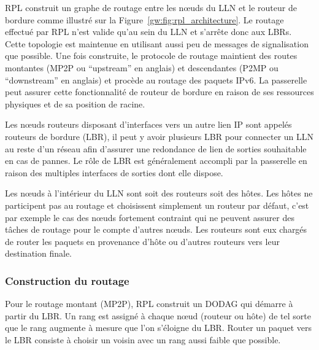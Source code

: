 \ac{RPL} construit un graphe de routage entre les nœuds du \ac{LLN} et le routeur de bordure comme illustré sur la Figure~\ref{gw:fig:rpl_architecture}.
Le routage effectué par \ac{RPL} n'est valide qu'au sein du \ac{LLN} et s'arrête donc aux \ac{LBR}s.
Cette topologie est maintenue en utilisant aussi peu de messages de signalisation que possible.
Une fois construite, le protocole de routage maintient des routes montantes (\ac{MP2P} ou ``upstream'' en anglais) et descendantes (\ac{P2MP} ou ``downstream'' en anglais) et procède au routage des paquets IPv6.
La passerelle peut assurer cette fonctionnalité de routeur de bordure en raison de ses ressources physiques et de sa position de racine.



Les nœuds routeurs disposant d'interfaces vers un autre lien IP sont appelés routeurs de bordure (\ac{LBR}), il peut y avoir plusieurs \ac{LBR} pour connecter un \ac{LLN} au reste d'un réseau afin d'assurer une redondance de lien de sorties souhaitable en cas de pannes.
Le rôle de \ac{LBR} est généralement accompli par la passerelle en raison des multiples interfaces de sorties dont elle dispose.

Les nœuds à l'intérieur du \ac{LLN} sont soit des routeurs soit des hôtes.
Les hôtes ne participent pas au routage et choisissent simplement un routeur par défaut, c'est par exemple le cas des nœuds fortement contraint qui ne peuvent assurer des tâches de routage pour le compte d'autres nœuds.
Les routeurs sont eux chargés de router les paquets en provenance d'hôte ou d'autres routeurs vers leur destination finale.

\subsubsection{Construction du routage}

Pour le routage montant (\ac{MP2P}), \ac{RPL} construit un \ac{DODAG} qui démarre à partir du \ac{LBR}.
Un rang est assigné à chaque nœud (routeur ou hôte) de tel sorte que le rang augmente à mesure que l'on s'éloigne du \ac{LBR}.
Router un paquet vers le \ac{LBR} consiste à choisir un voisin avec un rang aussi faible que possible.

